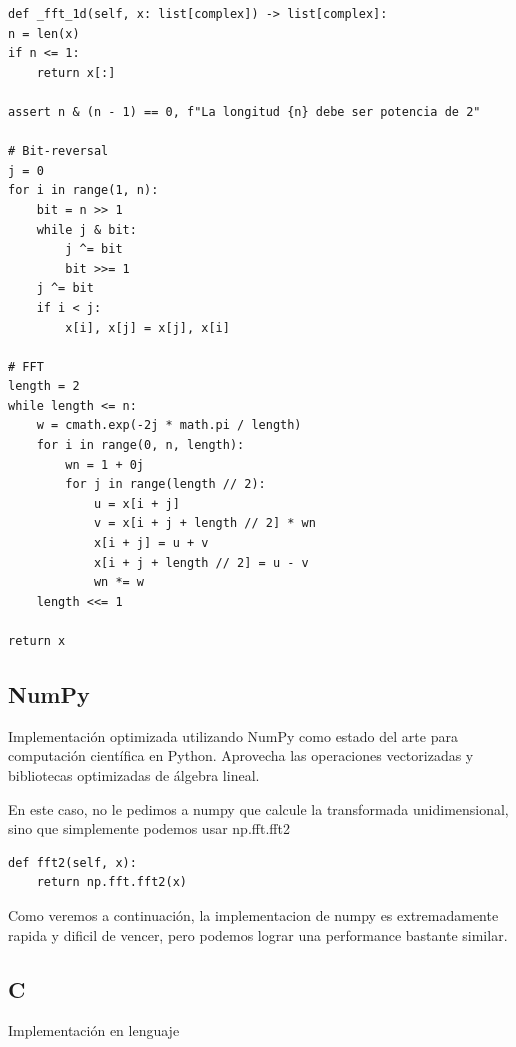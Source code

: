 \documentclass[a4paper]{article}
\begin{document}
\begin{verbatim}
def _fft_1d(self, x: list[complex]) -> list[complex]:
n = len(x)
if n <= 1:
    return x[:]

assert n & (n - 1) == 0, f"La longitud {n} debe ser potencia de 2"

# Bit-reversal
j = 0
for i in range(1, n):
    bit = n >> 1
    while j & bit:
        j ^= bit
        bit >>= 1
    j ^= bit
    if i < j:
        x[i], x[j] = x[j], x[i]

# FFT
length = 2
while length <= n:
    w = cmath.exp(-2j * math.pi / length)
    for i in range(0, n, length):
        wn = 1 + 0j
        for j in range(length // 2):
            u = x[i + j]
            v = x[i + j + length // 2] * wn
            x[i + j] = u + v
            x[i + j + length // 2] = u - v
            wn *= w
    length <<= 1

return x
\end{verbatim}

\subsection{NumPy}

Implementación optimizada utilizando NumPy como estado del arte para computación científica en Python. Aprovecha las operaciones
vectorizadas y bibliotecas optimizadas de álgebra lineal.

En este caso, no le pedimos a numpy que calcule la transformada unidimensional, sino que simplemente podemos usar np.fft.fft2

\begin{verbatim}
def fft2(self, x):
    return np.fft.fft2(x)
\end{verbatim}

Como veremos a continuación, la implementacion de numpy es extremadamente rapida y dificil de vencer, pero podemos lograr una
performance bastante similar.

\subsection{C}
Implementación en lenguaje
\end{document}
